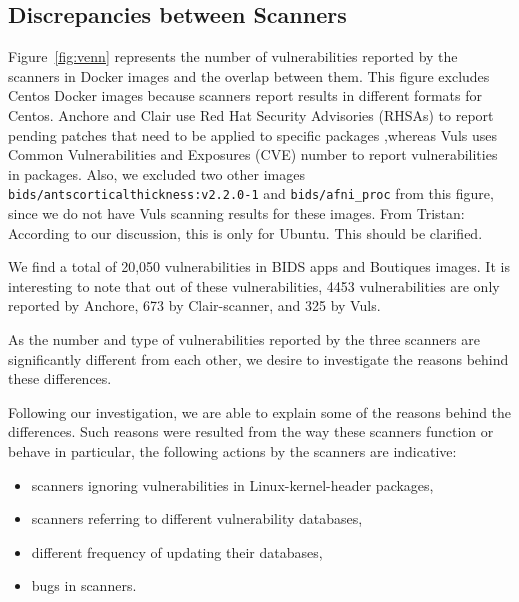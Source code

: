 \documentclass[a4paper,num-refs]{oup-contemporary}
\newcommand{\tristan}[1]{\color{blue}From Tristan: #1\color{black}}
\begin{document}

\subsection{Discrepancies between Scanners}

Figure~\ref{fig:venn} represents the number of vulnerabilities reported by
the scanners in Docker images and the overlap between them.
This figure excludes Centos Docker images because scanners report results in different
formats for Centos. Anchore and Clair use Red Hat Security Advisories (RHSAs)
to report pending patches that need to be applied to specific packages
,whereas Vuls uses Common Vulnerabilities and Exposures (CVE) number to report
vulnerabilities in packages. Also, we excluded two other images \texttt{bids/antscorticalthickness:v2.2.0-1} and
\texttt{bids/afni\_proc} from this figure, since we do not have Vuls scanning results for these images. 
\tristan{According to our discussion, this is only for Ubuntu. This should be clarified.}

We find a total of 20,050 vulnerabilities in BIDS apps and Boutiques images.
It is interesting to note that out of these vulnerabilities, 4453 vulnerabilities are only
reported by Anchore, 673 by Clair-scanner, and 325 by Vuls.

As the number and type of vulnerabilities reported by the three scanners are significantly different from each other,
we desire to investigate the reasons behind these differences.

Following our investigation, we are able to explain some of the reasons behind
the differences. 
Such reasons were resulted from the way these scanners function or behave 
in particular, the following actions by the scanners are indicative:
\begin{itemize}
   \item scanners ignoring vulnerabilities in Linux-kernel-header packages,
   \item scanners referring to different vulnerability databases,
   \item different frequency of updating their databases,
   \item bugs in scanners. 
\end{itemize}
\end{document}
